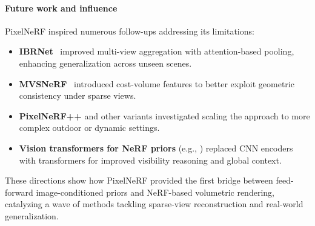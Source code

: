 \begin{enrichment}
\begin{enrichment}
     \newpage
     
     \paragraph{Future work and influence}  
     PixelNeRF inspired numerous follow-ups addressing its limitations:
     \begin{itemize}
         \item \textbf{IBRNet}~\cite{wang2021_ibrnet} improved multi-view aggregation with attention-based pooling, enhancing generalization across unseen scenes.
         \item \textbf{MVSNeRF}~\cite{chen2021_mvsnerf} introduced cost-volume features to better exploit geometric consistency under sparse views.
         \item \textbf{PixelNeRF++} and other variants investigated scaling the approach to more complex outdoor or dynamic settings.
         \item \textbf{Vision transformers for NeRF priors} (e.g., \cite{liu2022_neuray, johari2022_geonerf}) replaced CNN encoders with transformers for improved visibility reasoning and global context.
     \end{itemize}
     These directions show how PixelNeRF provided the first bridge between feed-forward image-conditioned priors and NeRF-based volumetric rendering, catalyzing a wave of methods tackling sparse-view reconstruction and real-world generalization.
     
 \end{enrichment}
    
\end{enrichment}

\newpage

